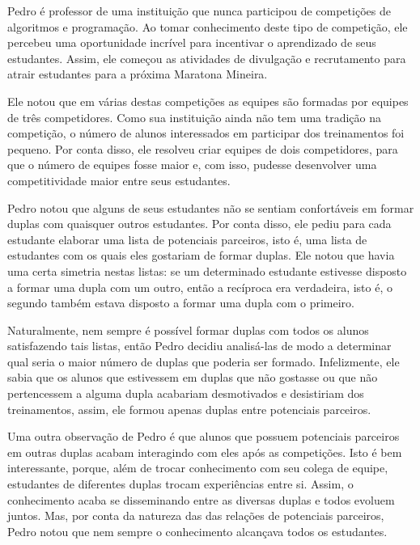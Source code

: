 %

Pedro é professor de uma instituição que nunca participou de competições de algoritmos e programação. Ao tomar conhecimento deste tipo de competição, ele percebeu uma oportunidade incrível para incentivar o aprendizado de seus estudantes. Assim, ele começou as atividades de divulgação e recrutamento para atrair estudantes para a próxima Maratona Mineira.

Ele notou que em várias destas competições as equipes são formadas por equipes de três competidores. Como sua instituição ainda não tem uma tradição na competição, o número de alunos interessados em participar dos treinamentos foi pequeno. Por conta disso, ele resolveu criar equipes de dois competidores, para que o número de equipes fosse maior e, com isso, pudesse desenvolver uma competitividade maior entre seus estudantes.

Pedro notou que alguns de seus estudantes não se sentiam confortáveis em formar duplas com quaisquer outros estudantes. Por conta disso, ele pediu para cada estudante elaborar uma lista de potenciais parceiros, isto é, uma lista de estudantes com os quais eles gostariam de formar duplas. Ele notou que havia uma certa simetria nestas listas: se um determinado estudante estivesse disposto a formar uma dupla com um outro, então a recíproca era verdadeira, isto é, o segundo também estava disposto a formar uma dupla com o primeiro.

Naturalmente, nem sempre é possível formar duplas com todos os alunos satisfazendo tais listas, então Pedro decidiu analisá-las de modo a determinar qual seria o maior número de duplas que poderia ser formado. Infelizmente, ele sabia que os alunos que estivessem em duplas que não gostasse ou que não pertencessem a alguma dupla acabariam desmotivados e desistiriam dos treinamentos, assim, ele formou apenas duplas entre potenciais parceiros.

Uma outra observação de Pedro é que alunos que possuem potenciais parceiros em outras duplas acabam interagindo com eles após as competições. Isto é bem interessante, porque, além de trocar conhecimento com seu colega de equipe, estudantes de diferentes duplas trocam experiências entre si. Assim, o conhecimento acaba se disseminando entre as diversas duplas e todos evoluem juntos. Mas, por conta da natureza das das relações de potenciais parceiros, Pedro notou que nem sempre o conhecimento alcançava todos os estudantes.

